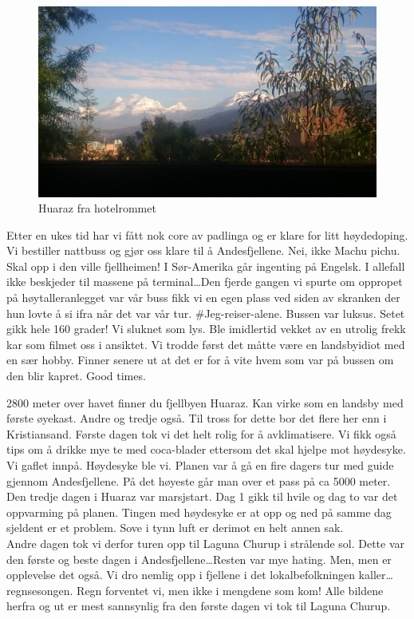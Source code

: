 \begin{figure}[!h]
	\centering
	\includegraphics[width=\textwidth]{Hotellromhuaraz}
	\caption{Huaraz fra hotelrommet}	
\label{fig:huaraz}
\end{figure}
Etter en ukes tid har vi fått nok core av padlinga og er klare for
litt høydedoping. Vi bestiller nattbuss og gjør oss klare til å
Andesfjellene. Nei, ikke Machu pichu. Skal opp i den ville
fjellheimen! I Sør-Amerika går ingenting på Engelsk. I allefall ikke
beskjeder til massene på terminal\ldots Den fjerde
gangen vi spurte om oppropet på høytalleranlegget var vår buss fikk vi
en egen plass ved siden av skranken der hun lovte å si ifra når det var vår
tur. \#Jeg-reiser-alene. Bussen var luksus. Setet gikk hele 160 grader!
Vi sluknet som lys. Ble imidlertid vekket av en utrolig frekk kar som
filmet oss i ansiktet. Vi trodde først det måtte være en landsbyidiot
med en sær hobby. Finner senere ut at det er for å vite hvem som var
på bussen om den blir kapret. Good times. 


2800 meter over havet finner du fjellbyen Huaraz. Kan virke som en
landsby med første øyekast. Andre og tredje også. Til tross for dette
bor det flere her enn i Kristiansand. Første dagen tok vi det helt
rolig for å avklimatisere. Vi  fikk også tips om å drikke mye te med coca-blader
ettersom det skal hjelpe mot høydesyke. Vi gaflet innpå. Høydesyke ble
vi. Planen var å gå en fire dagers tur med guide gjennom
Andesfjellene. På det høyeste går man over et pass på ca 5000 meter. Den tredje dagen i
Huaraz var marsjstart. Dag 1 gikk til hvile og  dag to var det
oppvarming på planen. Tingen med
høydesyke er at opp og ned på samme dag sjeldent er et problem. Sove i tynn luft er
derimot en helt annen sak.\\

Andre dagen tok vi derfor turen opp til Laguna Churup i
strålende sol. Dette var den første og beste dagen i
Andesfjellene\ldots  Resten
var mye hating. Men, men er opplevelse det også. 
Vi dro nemlig opp i fjellene i det lokalbefolkningen kaller\ldots 
regnsesongen. Regn forventet vi, men ikke i mengdene som kom! Alle bildene
herfra og ut er mest sannsynlig fra den første dagen vi tok til Laguna
Churup.\\ 




